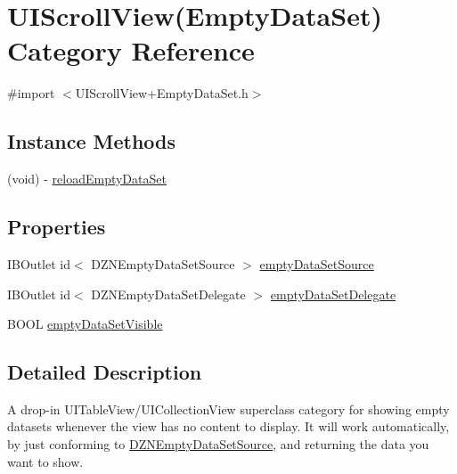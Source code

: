\hypertarget{category_u_i_scroll_view_07_empty_data_set_08}{}\section{U\+I\+Scroll\+View(Empty\+Data\+Set) Category Reference}
\label{category_u_i_scroll_view_07_empty_data_set_08}


{\ttfamily \#import $<$U\+I\+Scroll\+View+\+Empty\+Data\+Set.\+h$>$}

\subsection*{Instance Methods}
\begin{DoxyCompactItemize}
\item 
(void) -\/ \mbox{\hyperlink{category_u_i_scroll_view_07_empty_data_set_08_a921bb04152d8aec3e02737fca686f81c}{reload\+Empty\+Data\+Set}}
\end{DoxyCompactItemize}
\subsection*{Properties}
\begin{DoxyCompactItemize}
\item 
I\+B\+Outlet id$<$ D\+Z\+N\+Empty\+Data\+Set\+Source $>$ \mbox{\hyperlink{category_u_i_scroll_view_07_empty_data_set_08_a69b74429ac2bb95e0aa05201db1babb4}{empty\+Data\+Set\+Source}}
\item 
I\+B\+Outlet id$<$ D\+Z\+N\+Empty\+Data\+Set\+Delegate $>$ \mbox{\hyperlink{category_u_i_scroll_view_07_empty_data_set_08_a67c6ab0f3e207d07fa639a06261b2973}{empty\+Data\+Set\+Delegate}}
\item 
B\+O\+OL \mbox{\hyperlink{category_u_i_scroll_view_07_empty_data_set_08_a176eaa55323a1b5c727ee2c900912589}{empty\+Data\+Set\+Visible}}
\end{DoxyCompactItemize}


\subsection{Detailed Description}
A drop-\/in U\+I\+Table\+View/\+U\+I\+Collection\+View superclass category for showing empty datasets whenever the view has no content to display.  It will work automatically, by just conforming to \mbox{\hyperlink{class_d_z_n_empty_data_set_source-p}{D\+Z\+N\+Empty\+Data\+Set\+Source}}, and returning the data you want to show. 

